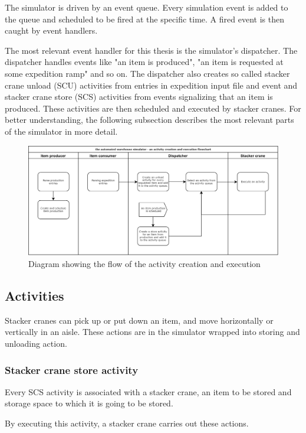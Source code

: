 \documentclass{ctuthesis}
\begin{document}
 The simulator is driven by an event queue. Every simulation event is added to the queue and scheduled to be fired at the specific time. A fired event is then caught by event handlers. 
 
 The most relevant event handler for this thesis is the simulator's dispatcher. The dispatcher handles events like "an item is produced", "an item is requested at some expedition ramp" and so on. The dispatcher also creates so called stacker crane unload (SCU) activities from entries in expedition input file and event and stacker crane store (SCS) activities from events signalizing that an item is produced. These activities are then scheduled and executed by stacker cranes. For better understanding, the following subsection describes the most relevant parts of the simulator in more detail.
 
\begin{figure}[H]
\includegraphics[width=1\linewidth]{flowchart2.png}
\caption{Diagram showing the flow of the activity creation and execution}
\label{flowchart1}
\end{figure}

\subsection{Activities}

Stacker cranes can pick up or put down an item, and move horizontally or vertically in an aisle. These actions are in the simulator wrapped into storing and unloading action.

\subsubsection{Stacker crane store activity}

Every SCS activity is associated with a stacker crane, an item to be stored and storage space to which it is going to be stored.

By executing this activity, a stacker crane carries out these actions.
\end{document}
